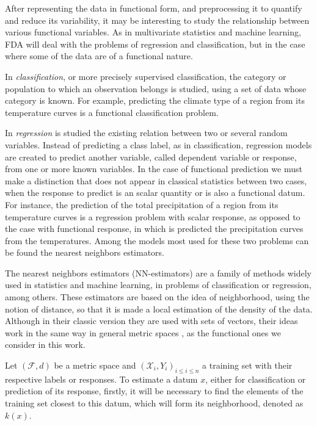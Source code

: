 
After representing the data in functional form, and preprocessing it to quantify and
reduce its variability, it may be interesting to study the relationship between
various functional variables. As in multivariate statistics and machine learning,
FDA will deal with the problems of regression and classification, but in the case
where some of the data are of a functional nature.


In \textit{classification}, or more precisely supervised classification, the category or
population to which an observation belongs is studied, using a set of data whose
category is known. For example, predicting the climate type of a region from
its temperature curves is a functional classification problem.

In \textit{regression} is studied the existing relation between two or several
random variables. Instead of predicting a class label, as in classification,
regression models are created to predict another variable, called dependent
variable or response, from one or more known variables. In the case of
functional prediction we must make a distinction that does not appear in
classical statistics between two cases, when the response to predict is an
scalar quantity or is also a functional datum. For instance, the prediction of
the total precipitation of a region from its temperature curves is a regression
problem with scalar response, as opposed to the case with functional response,
in which is predicted the precipitation curves from the temperatures.
Among the models most used for these two problems can be found the nearest
neighbors estimators.

The nearest neighbors estimators (NN-estimators) are a family of methods widely
used in statistics and machine learning, in problems of classification or
regression, among others. These estimators are based on the idea of
neighborhood, using the notion of distance, so that it is made a local
estimation of the density of the data.
Although in their classic version they are used with sets of vectors,
their ideas work in the same way in general metric
spaces \cite{baillo2010}, as the functional ones we consider in this work.

Let $(\mathcal{F}, d)$ be a metric space and
$(\mathcal{X}_i, {Y}_i)_{i \le i \le n}$ a training set with their
respective labels or responses.
To estimate a datum $x$, either for classification or prediction of its
response, firstly, it will be necessary to find the elements of the training set
closest to this datum, which will form its neighborhood, denoted as $k(x)$.

